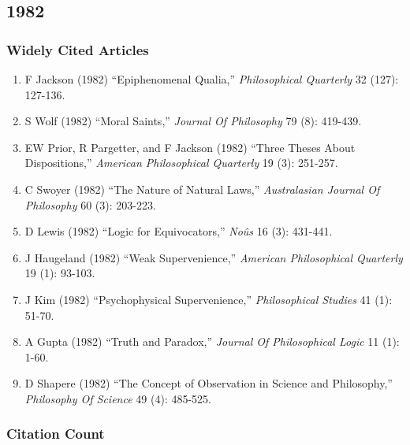 \documentclass[
  10pt,
  letterpaper,
  DIV=11,
  numbers=noendperiod,
  twoside]{scrartcl}
\providecommand{\tightlist}{%
  \setlength{\itemsep}{0pt}\setlength{\parskip}{0pt}}\usepackage{longtable,booktabs,array}
\begin{document}
\newpage

\subsection{1982}\label{sec-s1982}

\subsubsection*{Widely Cited Articles}\label{widely-cited-articles-26}

\begin{enumerate}
\def\labelenumi{\arabic{enumi}.}
\tightlist
\item
  F Jackson (1982) ``Epiphenomenal Qualia,'' \emph{Philosophical
  Quarterly} 32 (127): 127-136.
\item
  S Wolf (1982) ``Moral Saints,'' \emph{Journal Of Philosophy} 79 (8):
  419-439.
\item
  EW Prior, R Pargetter, and F Jackson (1982) ``Three Theses About
  Dispositions,'' \emph{American Philosophical Quarterly} 19 (3):
  251-257.
\item
  C Swoyer (1982) ``The Nature of Natural Laws,'' \emph{Australasian
  Journal Of Philosophy} 60 (3): 203-223.
\item
  D Lewis (1982) ``Logic for Equivocators,'' \emph{Noûs} 16 (3):
  431-441.
\item
  J Haugeland (1982) ``Weak Supervenience,'' \emph{American
  Philosophical Quarterly} 19 (1): 93-103.
\item
  J Kim (1982) ``Psychophysical Supervenience,'' \emph{Philosophical
  Studies} 41 (1): 51-70.
\item
  A Gupta (1982) ``Truth and Paradox,'' \emph{Journal Of Philosophical
  Logic} 11 (1): 1-60.
\item
  D Shapere (1982) ``The Concept of Observation in Science and
  Philosophy,'' \emph{Philosophy Of Science} 49 (4): 485-525.
\end{enumerate}

\subsubsection*{Citation Count}\label{sec-count-1982}
\end{document}
